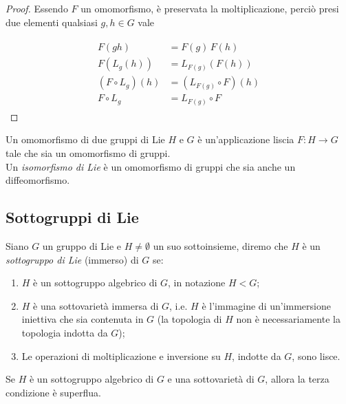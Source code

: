 \begin{proof}
	Essendo $ F $ un omomorfismo, è preservata la moltiplicazione, perciò presi due elementi qualsiasi $ g,h \in G $ vale
	
	\begin{align}
		\begin{split}
			F(g h) &= F(g) \, F(h) \\
			F(L_{g}(h)) &= L_{F(g)}(F(h)) \\
			(F \circ L_{g})(h) &= (L_{F(g)} \circ F)(h) \\
			F \circ L_{g} &= L_{F(g)} \circ F
		\end{split}
	\end{align}
\end{proof}

Un omomorfismo di due gruppi di Lie $ H $ e $ G $ è un'applicazione liscia $ F : H \to G $ tale che sia un omomorfismo di gruppi.\\
Un \textit{isomorfismo di Lie} è un omomorfismo di gruppi che sia anche un diffeomorfismo.

\subsection{Sottogruppi di Lie}

Siano $ G $ un gruppo di Lie e $ H \neq \emptyset $ un suo sottoinsieme, diremo che $ H $ è un \textit{sottogruppo di Lie} (immerso) di $ G $ se:

\begin{enumerate}
	\item $ H $ è un sottogruppo algebrico di $ G $, in notazione $ H < G $;
	
	\item $ H $ è una sottovarietà immersa di $ G $, i.e. $ H $ è l'immagine di un'immersione iniettiva che sia contenuta in $ G $ (la topologia di $ H $ non è necessariamente la topologia indotta da $ G $);
	
	\item Le operazioni di moltiplicazione e inversione su $ H $, indotte da $ G $, sono lisce.
\end{enumerate}

\begin{definition}
	Se $ H $ è un sottogruppo algebrico di $ G $ e una sottovarietà di $ G $, allora la terza condizione è superflua.
\end{definition}

